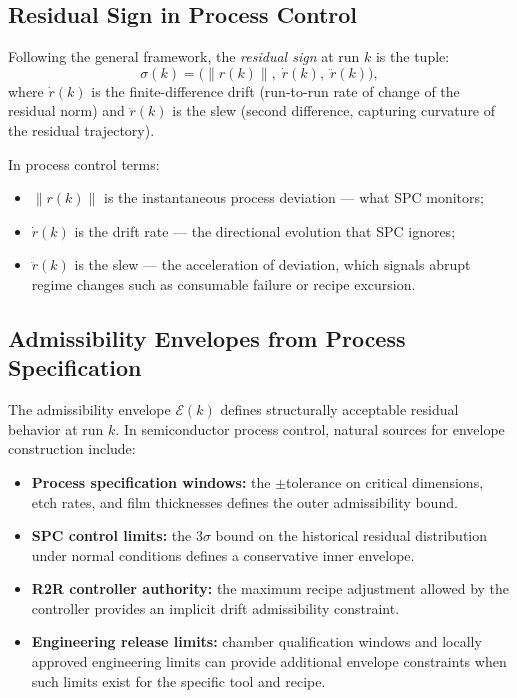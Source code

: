 \documentclass[11pt,letterpaper]{article}
\theoremstyle{scresult}
\newcommand{\norm}[1]{\left\|#1\right\|}
\begin{document}
\subsection{Residual Sign in Process Control}

Following the general framework, the \emph{residual sign} at run $k$ is the
tuple:
\begin{equation}
  \sigma(k) = \bigl(\norm{r(k)},\; \dot{r}(k),\; \ddot{r}(k)\bigr),
\end{equation}
where $\dot{r}(k)$ is the finite-difference drift (run-to-run rate of change
of the residual norm) and $\ddot{r}(k)$ is the slew (second difference,
capturing curvature of the residual trajectory).

In process control terms:
\begin{itemize}
  \item $\norm{r(k)}$ is the instantaneous process deviation --- what SPC
        monitors;
  \item $\dot{r}(k)$ is the drift rate --- the directional evolution that
        SPC ignores;
  \item $\ddot{r}(k)$ is the slew --- the acceleration of deviation, which
        signals abrupt regime changes such as consumable failure or recipe
        excursion.
\end{itemize}

\subsection{Admissibility Envelopes from Process Specification}

The admissibility envelope $\mathcal{E}(k)$ defines structurally acceptable
residual behavior at run $k$. In semiconductor process control, natural sources
for envelope construction include:

\begin{itemize}
  \item \textbf{Process specification windows:} the $\pm$tolerance on critical
        dimensions, etch rates, and film thicknesses defines the outer
        admissibility bound.
  \item \textbf{SPC control limits:} the $3\sigma$ bound on the historical
        residual distribution under normal conditions defines a conservative
        inner envelope.
  \item \textbf{R2R controller authority:} the maximum recipe adjustment
        allowed by the controller provides an implicit drift admissibility
        constraint.
  \item \textbf{Engineering release limits:} chamber qualification windows and
        locally approved engineering limits can provide additional envelope
        constraints when such limits exist for the specific tool and recipe.
\end{itemize}
\end{document}
